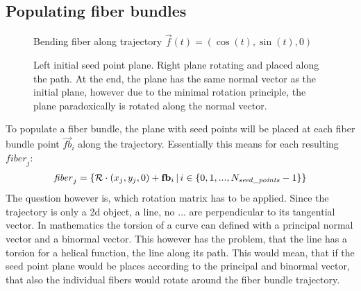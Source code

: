 \subsection{Populating fiber bundles}\label{sec:fillBundle}
% 
\begin{figure}[!t]
    \centering
	\caption[Bending filled fiber bundle]{Bending fiber along trajectory $\vec{f}(t) = \left(\cos(t), \sin(t), 0 \right)$ }
	\label{fig:bendingFiberBundle}
\end{figure}
% 
\begin{figure}[!t]
    \centering
    \setlength{\tikzwidth}{0.75\textwidth}
	\caption[]{Left initial seed point plane. Right plane rotating and placed along the path. At the end, the plane has the same normal vector as the initial plane, however due to the minimal rotation principle, the plane paradoxically is rotated along the normal vector.}
	\label{fig:torsion}
\end{figure}
% 
To populate a fiber bundle, the plane with seed points will be placed at each fiber bundle point $\vec{fb}_i$ along the trajectory.
Essentially this means for each resulting $\mathit{fiber}_j$:
\begin{align}
    \mathit{fiber}_j = \left\{ \mathcal{R} \cdot (x_j, y_j, 0) + \mathbf{fb}_i \, | \, i \in \{0,1,...,N_{\mathit{seed\_points}}-1\}\right\}
\end{align}
The question however is, which rotation matrix has to be applied.
Since the trajectory is only a 2d object, \ie{} a line, no ... are perpendicular to its tangential vector.
In mathematics the torsion of a curve can defined with a principal normal vector and a binormal vector.
This however has the problem, that the line has a torsion for a helical function, \ie{} the line  along its path.
This would mean, that if the seed point plane would be places according to the principal and binormal vector, that also the individual fibers would rotate around the fiber bundle trajectory.
